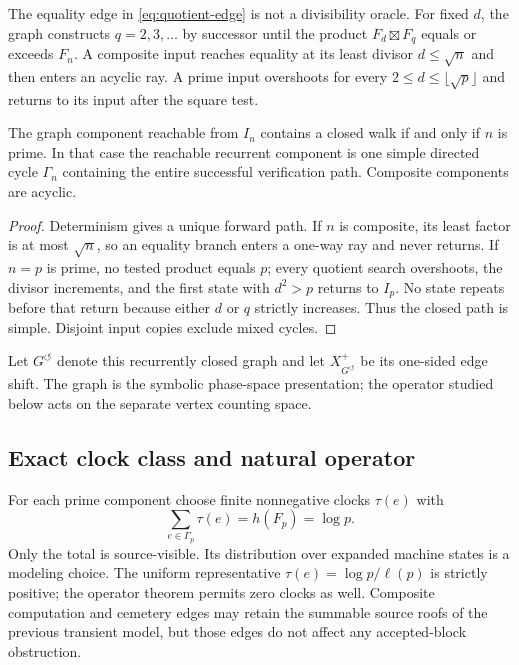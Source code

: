 The equality edge in \eqref{eq:quotient-edge} is not a divisibility oracle.
For fixed $d$, the graph constructs $q=2,3,\ldots$ by successor until the
product $F_d\boxtimes F_q$ equals or exceeds $F_n$.  A composite input reaches
equality at its least divisor $d\le\sqrt n$ and then enters an acyclic ray.  A
prime input overshoots for every $2\le d\le\lfloor\sqrt p\rfloor$ and returns
to its input after the square test.

\begin{proposition}
\label{prop:recurrent-census}
The graph component reachable from $I_n$ contains a closed walk if and only
if $n$ is prime.  In that case the reachable recurrent component is one
simple directed cycle $\Gamma_n$ containing the entire successful
verification path.  Composite components are acyclic.
\end{proposition}

\begin{proof}
Determinism gives a unique forward path.  If $n$ is composite, its least
factor is at most $\sqrt n$, so an equality branch enters a one-way ray and
never returns.  If $n=p$ is prime, no tested product equals $p$; every
quotient search overshoots, the divisor increments, and the first state with
$d^2>p$ returns to $I_p$.  No state repeats before that return because either
$d$ or $q$ strictly increases.  Thus the closed path is simple.  Disjoint
input copies exclude mixed cycles.
\end{proof}

Let $G^{\circlearrowleft}$ denote this recurrently closed graph and let
$X^+_{G^{\circlearrowleft}}$ be its one-sided edge shift.  The graph is the
symbolic phase-space presentation; the operator studied below acts on the
separate vertex counting space.

\subsection{Exact clock class and natural operator}

For each prime component choose finite nonnegative clocks $\tau(e)$ with
\begin{equation}
\sum_{e\in\Gamma_p}\tau(e)=h(F_p)=\log p.
\label{eq:exact-clock}
\end{equation}
Only the total is source-visible.  Its distribution over expanded machine
states is a modeling choice.  The uniform representative
$\tau(e)=\log p/\ell(p)$ is strictly positive; the operator theorem permits
zero clocks as well.  Composite computation and cemetery edges may retain
the summable source roofs of the previous transient model, but those edges do
not affect any accepted-block obstruction.

